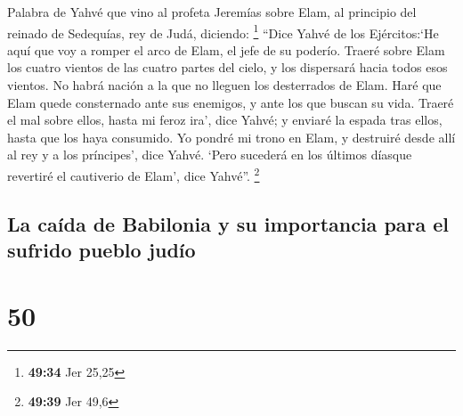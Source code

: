  Palabra de Yahvé que vino al profeta Jeremías sobre
Elam, al principio del reinado de Sedequías, rey de Judá, diciendo:
\footnote{\textbf{49:34} Jer 25,25}  ``Dice Yahvé de los
Ejércitos:`He aquí que voy a romper el arco de Elam, el jefe de su
poderío.  Traeré sobre Elam los cuatro vientos de las
cuatro partes del cielo, y los dispersará hacia todos esos vientos. No
habrá nación a la que no lleguen los desterrados de Elam.
 Haré que Elam quede consternado ante sus enemigos, y
ante los que buscan su vida. Traeré el mal sobre ellos, hasta mi feroz
ira', dice Yahvé; y enviaré la espada tras ellos, hasta que los haya
consumido.  Yo pondré mi trono en Elam, y destruiré desde
allí al rey y a los príncipes', dice Yahvé.  `Pero
sucederá en los últimos díasque revertiré el cautiverio de Elam', dice
Yahvé''. \footnote{\textbf{49:39} Jer 49,6}

\hypertarget{la-cauxedda-de-babilonia-y-su-importancia-para-el-sufrido-pueblo-juduxedo}{%
\subsection{La caída de Babilonia y su importancia para el sufrido
pueblo
judío}\label{la-cauxedda-de-babilonia-y-su-importancia-para-el-sufrido-pueblo-juduxedo}}

\hypertarget{section-49}{%
\section{50}\label{section-49}}

